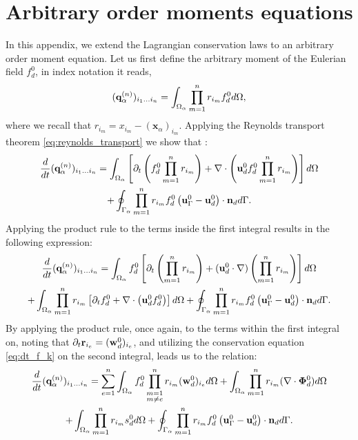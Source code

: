 
\section{Arbitrary order moments equations}
\label{ap:Moments_equations}
In this appendix, we extend the Lagrangian conservation laws to an arbitrary order moment equation. 
Let us first define the arbitrary moment of the Eulerian field $f_d^0$, in index notation it reads, 
\begin{equation*}
    (\textbf{q}_\alpha^{(n)})_{i_1\ldots i_n}
    = \int_{\Omega_{\alpha}} 
    \prod_{m=1}^{n} r_{i_m} f_d^0 
     d\Omega, 
\end{equation*}
where we recall that $r_{i_m} = x_{i_m} - (\textbf{x}_\alpha)_{i_m}$. 
Applying the Reynolds transport theorem \eqref{eq:reynolds_transport} we show that :
\begin{multline}
    \frac{d}{dt} {(\textbf{q}_\alpha^{(n)})_{i_1\ldots i_n}}
    =\int_{\Omega_{\alpha}} 
        \left[ \partial_t \left(f_d^0 \prod_{m=1}^{n} r_{i_m}\right) 
    + \mathbf{\nabla}\cdot \left(\textbf{u}_d^0 f_d^0 \prod_{m=1}^{n} r_{i_m}\right) \right]
     d\Omega\\
    +\oint_{\Gamma_{\alpha}}  \prod_{m=1}^{n} r_{i_m} f_d^0 \left(\textbf{u}_\Gamma^0 - \textbf{u}_d^0\right)\cdot \textbf{n}_d  d\Gamma. 
\end{multline}
Applying the product rule to the terms inside the first integral results in the following expression: 
\begin{multline}
    \frac{d}{dt} {(\textbf{q}_\alpha^{(n)})_{i_1\ldots i_n}}
    =\int_{\Omega_{\alpha}}  
        f_d^0 \left[ \partial_t \left(\prod_{m=1}^{n} r_{i_m}\right) 
        + (\textbf{u}_d^0\cdot \mathbf{\nabla}) \left( \prod_{m=1}^{n} r_{i_m}\right) \right]
     d\Omega\\
    +\int_{\Omega_{\alpha}}  
        \prod_{m=1}^{n} r_{i_m} 
        \left[ \partial_t f_d^0
    +  \mathbf{\nabla}\cdot \left(\textbf{u}_d^0 f_d^0 \right) \right]
     d\Omega
    +\oint_{\Gamma_{\alpha}}  \prod_{m=1}^{n} r_{i_m} f_d^0 \left(\textbf{u}_\Gamma^0 - \textbf{u}_d^0\right)\cdot \textbf{n}_d  d\Gamma. 
\end{multline}
By applying the product rule, once again, to the terms within the first integral on, noting that $\partial_t \textbf{r}_{i_e} = (\textbf{w}_d^0)_{i_e}$, and utilizing the conservation equation \ref{eq:dt_f_k} on the second integral, leads us to the relation: 
\begin{multline}
    \frac{d}{dt} {(\textbf{q}_\alpha^{(n)})_{i_1\ldots i_n}}
    = \sum_{e=1}^{n} \int_{\Omega_{\alpha}}  
        f_d^0 \prod^{n}_{\substack{ m=1 \\   m \neq e}} r_{i_m} (\textbf{w}_d^0)_{i_e}
         d\Omega
    +\int_{\Omega_{\alpha}} \prod_{m=1}^{n} r_{i_m} (\mathbf{\nabla}\cdot\bm{\Phi}_d^0) d\Omega\\
    + \int_{\Omega_{\alpha}}  \prod_{m=1}^{n} r_{i_m} s_d^0 d\Omega
    +\oint_{\Gamma_{\alpha}}  \prod_{m=1}^{n} r_{i_m} f_d^0 \left(\textbf{u}_\Gamma^0 - \textbf{u}_d^0\right)\cdot \textbf{n}_d  d\Gamma.
\end{multline}
